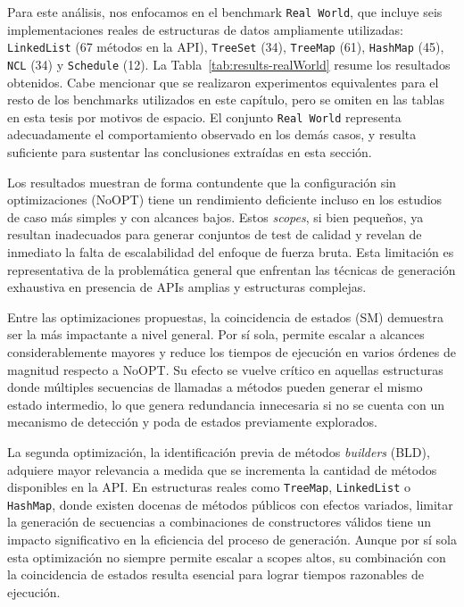 Para este análisis, nos enfocamos en el benchmark \texttt{Real World}, que incluye seis 
implementaciones reales de estructuras de datos ampliamente utilizadas: \texttt{LinkedList} 
(67 métodos en la API), \texttt{TreeSet} (34), \texttt{TreeMap} (61), \texttt{HashMap} (45), \texttt{NCL} (34) y 
\texttt{Schedule} (12). La Tabla~\ref{tab:results-realWorld} 
resume los resultados obtenidos. Cabe mencionar que se realizaron experimentos equivalentes para 
el resto de los benchmarks utilizados en este capítulo, pero se omiten en las tablas en esta tesis por motivos de espacio.
El conjunto \texttt{Real World} representa adecuadamente el comportamiento observado en los demás casos, 
y resulta suficiente para sustentar las conclusiones extraídas en esta sección.

Los resultados muestran de forma contundente que la configuración sin optimizaciones (\textsf{NoOPT}) 
tiene un rendimiento deficiente incluso en los estudios de caso más simples y con alcances bajos. 
Estos \emph{scopes}, si bien pequeños, ya resultan inadecuados para generar conjuntos de test de 
calidad y revelan de inmediato la falta de escalabilidad del enfoque de fuerza bruta. Esta limitación 
es representativa de la problemática general que enfrentan las técnicas de generación exhaustiva en 
presencia de APIs amplias y estructuras complejas.

Entre las optimizaciones propuestas, la coincidencia de estados (\textsf{SM}) demuestra ser la más 
impactante a nivel general. Por sí sola, permite escalar a alcances considerablemente mayores y reduce 
los tiempos de ejecución en varios órdenes de magnitud respecto a \textsf{NoOPT}. Su efecto se vuelve 
crítico en aquellas estructuras donde múltiples secuencias de llamadas a métodos pueden generar el mismo estado 
intermedio, lo que genera redundancia innecesaria si no se cuenta con un mecanismo de detección y poda 
de estados previamente explorados.

La segunda optimización, la identificación previa de métodos \emph{builders} (\textsf{BLD}), adquiere 
mayor relevancia a medida que se incrementa la cantidad de métodos disponibles en la API. En 
estructuras reales como \texttt{TreeMap}, \texttt{LinkedList} o \texttt{HashMap}, donde existen 
docenas de métodos públicos con efectos variados, limitar la generación de secuencias a combinaciones 
de constructores válidos tiene un impacto significativo en la eficiencia del proceso de generación. 
Aunque por sí sola esta optimización no siempre permite escalar a scopes altos, su combinación con la 
coincidencia de estados resulta esencial para lograr tiempos razonables de ejecución.

